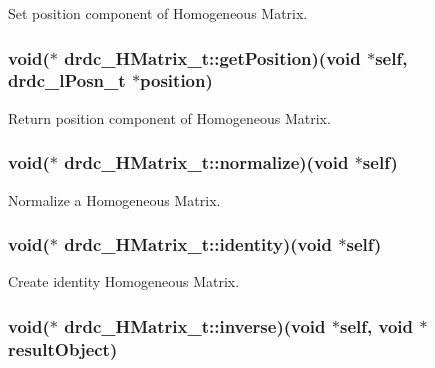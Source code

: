Set position component of Homogeneous Matrix. 

\hypertarget{structdrdc__HMatrix__t_432d1b20c6fc79da446a894988ad188e}{
\subsubsection[getPosition]{\setlength{\rightskip}{0pt plus 5cm}void($\ast$ {\bf drdc\_\-HMatrix\_\-t::getPosition})(void $\ast$self, {\bf drdc\_\-lPosn\_\-t} $\ast$position)}}
\label{structdrdc__HMatrix__t_432d1b20c6fc79da446a894988ad188e}


Return position component of Homogeneous Matrix. 

\hypertarget{structdrdc__HMatrix__t_8230fd2af3d183116fa13ccf499c3ab5}{
\subsubsection[normalize]{\setlength{\rightskip}{0pt plus 5cm}void($\ast$ {\bf drdc\_\-HMatrix\_\-t::normalize})(void $\ast$self)}}
\label{structdrdc__HMatrix__t_8230fd2af3d183116fa13ccf499c3ab5}


Normalize a Homogeneous Matrix. 

\hypertarget{structdrdc__HMatrix__t_d574009aefa57168f502263da6ff25bc}{
\subsubsection[identity]{\setlength{\rightskip}{0pt plus 5cm}void($\ast$ {\bf drdc\_\-HMatrix\_\-t::identity})(void $\ast$self)}}
\label{structdrdc__HMatrix__t_d574009aefa57168f502263da6ff25bc}


Create identity Homogeneous Matrix. 

\hypertarget{structdrdc__HMatrix__t_004d664a140115f5ef8f2b093cdab339}{
\subsubsection[inverse]{\setlength{\rightskip}{0pt plus 5cm}void($\ast$ {\bf drdc\_\-HMatrix\_\-t::inverse})(void $\ast$self, void $\ast$resultObject)}}
\label{structdrdc__HMatrix__t_004d664a140115f5ef8f2b093cdab339}


